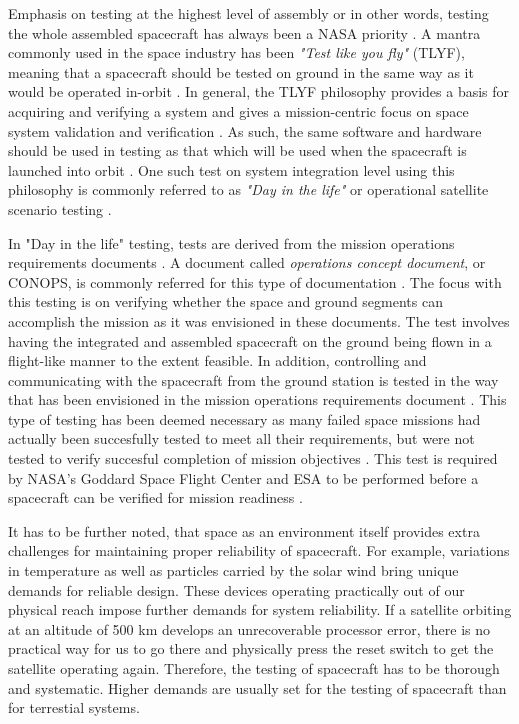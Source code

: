 \documentclass[english,12pt,a4paper,pdftex,elec,utf8]{aaltothesis}
\begin{document}
Emphasis on testing at the highest level of assembly or in other words, testing the whole assembled spacecraft has always been a NASA priority \cite{reliabilitylessonsfromnasa}. A mantra commonly used in the space industry has been \textit{"Test like you fly"} (TLYF), meaning that a spacecraft should be tested on ground in the same way as it would be operated in-orbit \cite{satverplanning, tor}.  In general, the TLYF philosophy provides a basis for acquiring and verifying a system and gives a mission-centric focus on space system validation and verification \cite{tor}. As such, the same software and hardware should be used in testing as that which will be used when the spacecraft is launched into orbit \cite{satverplanning}. One such test on system integration level using this philosophy is commonly referred to as \textit{"Day in the life"} or operational satellite scenario testing \cite{satverplanning, tor}. \par
In "Day in the life" testing, tests are derived from the mission operations requirements documents \cite{tor}. A document called \textit{operations concept document}, or CONOPS, is commonly referred for this type of documentation \cite{tor}. The focus with this testing is on verifying whether the space and ground segments can accomplish the mission as it was envisioned in these documents. The test involves having the integrated and assembled spacecraft on the ground being flown in a flight-like manner to the extent feasible. In addition, controlling and communicating with the spacecraft from the ground station is tested in the way that has been envisioned in the mission operations requirements document \cite{tor}. This type of testing has been deemed necessary as many failed space missions had actually been succesfully tested to meet all their requirements, but were not tested to verify succesful completion of mission objectives \cite{tor}. This test is required by NASA's Goddard Space Flight Center and ESA to be performed before a spacecraft can be verified for mission readiness \cite{tor, ecss}. \par
It has to be further noted, that space as an environment itself provides extra challenges for maintaining proper reliability of spacecraft. For example, variations in temperature as well as particles carried by the solar wind bring unique demands for reliable design. These devices operating practically out of our physical reach impose further demands for system reliability. If a satellite orbiting at an altitude of 500 km develops an unrecoverable processor error, there is no practical way for us to go there and physically press the reset switch to get the satellite operating again. Therefore, the testing of spacecraft has to be thorough and systematic. Higher demands are usually set for the testing of spacecraft than for terrestial systems. \cite{spacesystemsengineering} \par 
\end{document}
